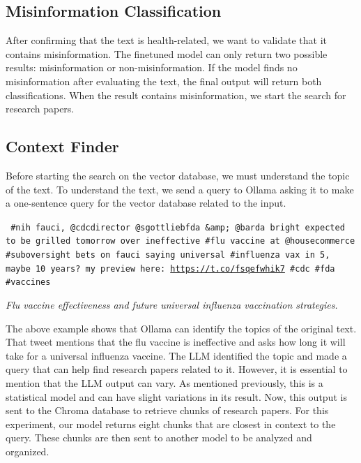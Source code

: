 \subsection{Misinformation Classification}
After confirming that the text is health-related, we want to validate that it contains misinformation. The finetuned model can only return two possible results: misinformation or non-misinformation. If the model finds no misinformation after evaluating the text,
the final output will return both classifications. When the result contains misinformation, we start the search for research papers.

\subsection{Context Finder}
Before starting the search on the vector database, we must understand the topic of the text. To understand the text, we send a query to Ollama asking it to make a one-sentence query for the vector database related to the input.

 
 \begin{tcolorbox}[colback=gray!10, colframe=black!70, title=Input]
\texttt{%
\#nih fauci, @cdcdirector @sgottliebfda \&amp; @barda bright expected to be grilled tomorrow over ineffective \#flu vaccine at @housecommerce \#suboversight bets on fauci saying universal \#influenza vax in 5, maybe 10 years? my preview here: \url{https://t.co/fsqefwhik7} \#cdc \#fda \#vaccines%
}
\end{tcolorbox}

\begin{tcolorbox}[colback=white, colframe=black!70, title=Output]
\textit{%
Flu vaccine effectiveness and future universal influenza vaccination strategies.%
}
\end{tcolorbox}
 
The above example shows that Ollama can identify the topics of the original text. That tweet mentions that the flu vaccine is ineffective and asks how long it will take for a universal influenza vaccine. The LLM identified the topic and made a query that can help find
research papers related to it. However, it is essential to mention that the LLM output can vary. As mentioned previously, this is a statistical model and can have slight variations in its result. Now, this output is sent to the Chroma database to retrieve chunks of research
papers. For this experiment, our model returns eight chunks that are closest in context to the query. These chunks are then sent to another model to be analyzed and organized.

